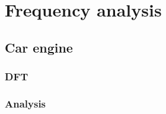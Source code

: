 \section{Frequency analysis}
\label{sec:analysis}
\subsection{Car engine}

\subsubsection{DFT}

\subsubsection{Analysis}

